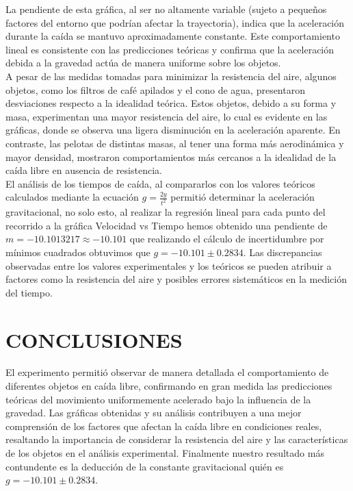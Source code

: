 \documentclass[journal]{IEEEtran}
\begin{document}
La pendiente de esta gráfica, al ser no altamente variable (sujeto a pequeños factores del entorno que podrían afectar la trayectoria), indica que la aceleración durante la caída se mantuvo aproximadamente constante. Este comportamiento lineal es consistente con las predicciones teóricas y confirma que la aceleración debida a la gravedad actúa de manera uniforme sobre los objetos.\\

A pesar de las medidas tomadas para minimizar la resistencia del aire, algunos objetos, como los filtros de café apilados y el cono de agua, presentaron desviaciones respecto a la idealidad teórica. Estos objetos, debido a su forma y masa, experimentan una mayor resistencia del aire, lo cual es evidente en las gráficas, donde se observa una ligera disminución en la aceleración aparente. En contraste, las pelotas de distintas masas, al tener una forma más aerodinámica y mayor densidad, mostraron comportamientos más cercanos a la idealidad de la caída libre en ausencia de resistencia. \\

El análisis de los tiempos de caída, al compararlos con los valores teóricos calculados mediante la ecuación $g = \frac{2y}{t^2}$ permitió determinar la aceleración gravitacional, no solo esto, al realizar la regresión lineal para cada punto del recorrido a la gráfica Velocidad vs Tiempo hemos obtenido una pendiente de $m= -10.1013217 \approx -10.101$ que realizando el cálculo de incertidumbre por mínimos cuadrados obtuvimos que $g = -10.101 \pm 0.2834$. Las discrepancias observadas entre los valores experimentales y los teóricos se pueden atribuir a factores como la resistencia del aire y posibles errores sistemáticos en la medición del tiempo.\\


\section{CONCLUSIONES} 
El experimento permitió observar de manera detallada el comportamiento de diferentes objetos en caída libre, confirmando en gran medida las predicciones teóricas del movimiento uniformemente acelerado bajo la influencia de la gravedad. Las gráficas obtenidas y su análisis contribuyen a una mejor comprensión de los factores que afectan la caída libre en condiciones reales, resaltando la importancia de considerar la resistencia del aire y las características de los objetos en el análisis experimental. Finalmente nuestro resultado más contundente es la deducción de la constante gravitacional quién es $g = -10.101 \pm 0.2834$.
\end{document}
